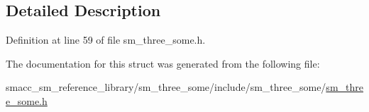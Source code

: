 \subsection{Detailed Description}


Definition at line 59 of file sm\+\_\+three\+\_\+some.\+h.



The documentation for this struct was generated from the following file\+:\begin{DoxyCompactItemize}
\item 
smacc\+\_\+sm\+\_\+reference\+\_\+library/sm\+\_\+three\+\_\+some/include/sm\+\_\+three\+\_\+some/\hyperlink{sm__three__some_8h}{sm\+\_\+three\+\_\+some.\+h}\end{DoxyCompactItemize}
